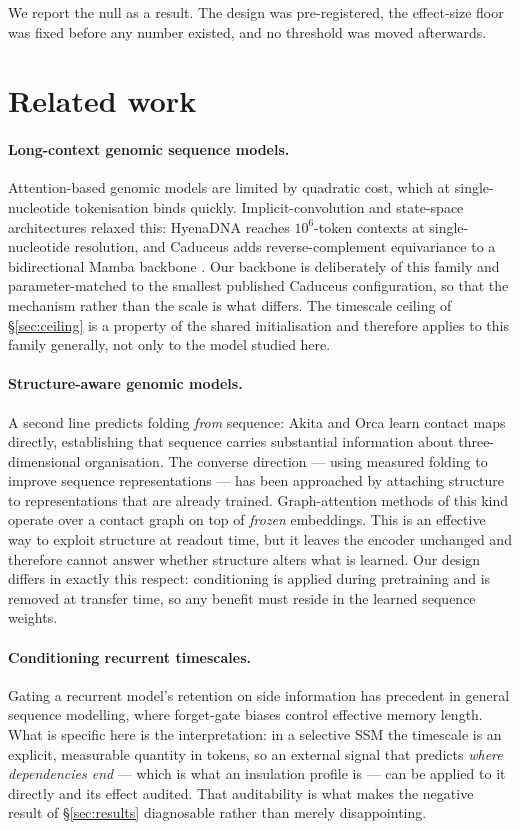\documentclass[10pt]{article}
\begin{document}
We report the null as a result. The design was pre-registered, the effect-size
floor was fixed before any number existed, and no threshold was moved
afterwards.

\section{Related work}

\paragraph{Long-context genomic sequence models.}
Attention-based genomic models are limited by quadratic cost, which at
single-nucleotide tokenisation binds quickly. Implicit-convolution and
state-space architectures relaxed this: HyenaDNA \citep{nguyen2023hyenadna}
reaches $10^{6}$-token contexts at single-nucleotide resolution, and Caduceus
\citep{schiff2024caduceus} adds reverse-complement equivariance to a
bidirectional Mamba backbone \citep{gu2023mamba}. Our backbone is deliberately
of this family and parameter-matched to the smallest published Caduceus
configuration, so that the mechanism rather than the scale is what differs.
The timescale ceiling of \S\ref{sec:ceiling} is a property of the shared
initialisation and therefore applies to this family generally, not only to the
model studied here.

\paragraph{Structure-aware genomic models.}
A second line predicts folding \emph{from} sequence: Akita and Orca learn
contact maps directly, establishing that sequence carries substantial
information about three-dimensional organisation. The converse direction ---
using measured folding to improve sequence representations --- has been
approached by attaching structure to representations that are already trained.
Graph-attention methods of this kind operate over a contact graph on top of
\emph{frozen} embeddings. This is an effective way to exploit structure at
readout time, but it leaves the encoder unchanged and therefore cannot answer
whether structure alters what is learned. Our design differs in exactly this
respect: conditioning is applied during pretraining and is removed at transfer
time, so any benefit must reside in the learned sequence weights.

\paragraph{Conditioning recurrent timescales.}
Gating a recurrent model's retention on side information has precedent in
general sequence modelling, where forget-gate biases control effective memory
length. What is specific here is the interpretation: in a selective SSM the
timescale is an explicit, measurable quantity in tokens, so an external signal
that predicts \emph{where dependencies end} --- which is what an insulation
profile is --- can be applied to it directly and its effect audited. That
auditability is what makes the negative result of \S\ref{sec:results}
diagnosable rather than merely disappointing.
\end{document}
